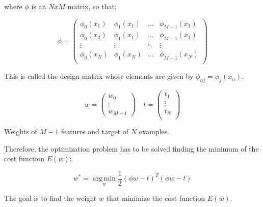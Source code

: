 \noindent where $\phi$ is an $N x M$ matrix, so that:
 
\begin{Equation}[!htb]
	\centering
	\begin{equation} \label{eq:designmatrix}
	\phi =
		\begin{pmatrix}
			\phi_0(x_1) & \phi_1(x_1) & \dots & \phi_{M-1}(x_1) \\
			\phi_0(x_2) & \phi_1(x_1) & \dots & \phi_{M-1}(x_1) \\
			\vdots & \vdots & \ddots & \vdots \\
			\phi_0(x_N) & \phi_1(x_N) & \dots & \phi_{M-1}(x_N) \\
		\end{pmatrix}
	\end{equation}
	\caption[Design matrix.]{This is called the design matrix whose elements are given by $\phi_{nj} = \phi_j(x_n)$.}
\end{Equation}

\begin{Equation}[!htb]
	\centering
	\begin{equation} \label{eq:weightsandtarget}
		w = 
		\begin{pmatrix}
			w_0 \\
			\vdots \\
			w_{M-1}
		\end{pmatrix}
		\quad t =
		\begin{pmatrix}
			t_1 \\
			\vdots \\
			t_N \\
		\end{pmatrix}
	\end{equation}
	\caption[Weights of $M-1$ features and target of $N$ examples.]{Weights of $M-1$ features and target of $N$ examples.}
\end{Equation}

\noindent Therefore, the optimization problem has to be solved finding the minimum of the cost function $E(w)$:
\begin{Equation}[H]
	\centering
	\begin{equation} \label{eq:mincostregr}
		w^*= \operatorname*{arg\,min}_w  \frac{1}{2}(\phi w - t)^T (\phi w - t)
	\end{equation}
	\caption[Optimization problem for ridge regression.]{The goal is to find the weight $w$ that minimize the cost function $E(w)$.}
\end{Equation}

